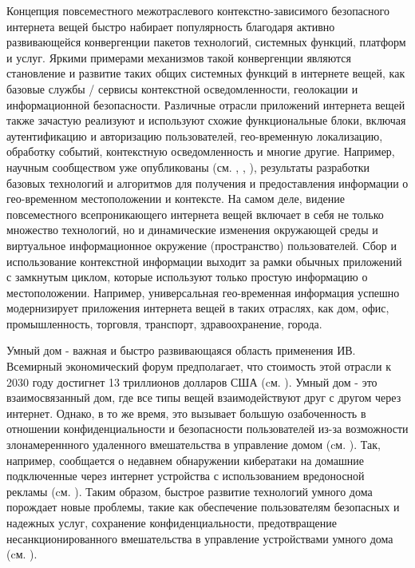 Концепция повсеместного межотраслевого контекстно-зависимого безопасного интернета вещей быстро набирает популярность благодаря активно развивающейся конвергенции пакетов технологий, системных функций, платформ и услуг. Яркими примерами механизмов такой конвергенции являются становление и развитие таких общих системных функций в интернете вещей, как базовые службы / сервисы контекстной осведомленности, геолокации и информационной безопасности. Различные отрасли приложений интернета вещей также зачастую реализуют и используют схожие функциональные блоки, включая аутентификацию и авторизацию пользователей, гео-временную локализацию, обработку событий, контекстную осведомленность и многие другие. Например, научным сообществом уже опубликованы (см. , , ), результаты разработки базовых технологий и алгоритмов для получения и предоставления информации о гео-временном местоположении и контексте. На самом деле, видение повсеместного всепроникающего интернета вещей включает в себя не только множество технологий, но и динамические изменения окружающей среды и виртуальное информационное окружение (пространство) пользователей. Сбор и использование контекстной информации выходит за рамки обычных приложений с замкнутым циклом, которые используют только простую информацию о местоположении. Например, универсальная гео-временная информация успешно модернизирует приложения интернета вещей в таких отраслях, как дом, офис, промышленность, торговля, транспорт, здравоохранение, города.

Умный дом -  важная и быстро развивающаяся область применения ИВ. Всемирный экономический форум предполагает, что стоимость этой отрасли к 2030 году достигнет 13 триллионов долларов США (cм. ). Умный дом - это взаимосвязанный дом, где все типы вещей взаимодействуют друг с другом через интернет. Однако, в то же время, это вызывает большую озабоченность в отношении конфиденциальности и безопасности пользователей из-за возможности злонамереннного удаленного вмешательства в управление домом (cм. ). Так, например, сообщается о недавнем обнаружении кибератаки на домашние подключенные через интернет устройства с использованием вредоносной рекламы  (cм. ). Таким образом, быстрое развитие технологий умного дома порождает новые проблемы, такие как обеспечение пользователям безопасных и надежных услуг, сохранение конфиденциальности, предотвращение несанкционированного вмешательства в управление устройствами умного дома (cм. ).

